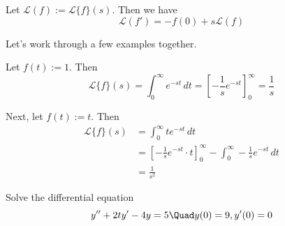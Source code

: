 Let $\mathcal L(f):=\mathcal L\{f\}(s)$. Then we have
$$
  \mathcal L(f')=-f(0)+s\mathcal L(f)
$$

\begin{compute}
  Let's work through a few examples together.

  Let $f(t):=1$. Then
  $$
    \mathcal L\{f\}(s)
    =\int_0^\infty e^{-st}\,dt
    =\left[-\frac1se^{-st}\right]_0^\infty
    =\frac1s
  $$

  Next, let $f(t):=t$. Then
  \begin{align*}
    \mathcal L\{f\}(s)
     &=\int_0^\infty te^{-st}\,dt                                                    \\
     &=\left[-\frac1se^{-st}\cdot t\right]_0^\infty-\int_0^\infty-\frac1se^{-st}\,dt \\
     &=\frac1{s^2}
  \end{align*}
\end{compute}

\label{b0e53e0}

Solve the differential equation
$$
  y'' + 2ty' - 4y = 5\Quad y(0)=9,y'(0)=0
$$

